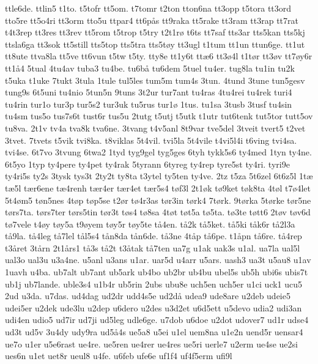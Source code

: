 {ttle6de.
ttlin5
t1to.
t5tofr
tt5om.
t7tomr
t2ton
tton6na
tt3opp
t5tora
tt3ord
tto5re
tt5o4ri
tt3orm
tto5u
ttpar4
tt6p^^e5s
tt9raka
tt5rake
tt3ram
tt3rap
tt7rat
t4t3rep
tt3res
tt3rev
tt5rom
t5trop
t5try
t2t1r^^f8
t6ts
tt7saf
tts3ar
tts5kan
tts5kj
ttsla6ga
tt3sok
tt5still
tts5top
tts5tra
tts5t^^f8y
tt3ugl
t1tum
tt1un
ttun6ge.
tt1ut
tt8ute
ttva8la
tt5ve
tt6vun
t5tw
t5ty.
tty8e
tt1y6t
tt^^e66
tt3^^f84l
t1t^^f8r
tt3^^f8v
tt7^^f8y6r
tt1^^e54
5tual
4tu4av
tuba3
tu4be.
tu6b^^e5
tu6dem
5tuel
tu4er.
tug8la
tu1in
tu2k
t5uka
t1uke
7tukt
3tula
1tule
tul5les
tum5m
tum4s
3tun.
4tund
3tune
tun5gesv
tung9s
6t5uni
tu4nio
5tun5n
9tuns
3t2ur
tur7ant
tu4ras
4tu4rei
tu4rek
turi4
tu4rin
tur1o
tur3p
tur5s2
tur3uk
tu5rus
tur1^^f8
1tus.
tu1sa
3tusb
3tusf
tu4sin
tu4sm
tus5o
tus7s6t
tust6r
tus5u
2tutg
t5utj
t5utk
t1utr
tut6tenk
tut5tor
tutt5ov
tu8va.
2t1v
tv4a
tva8k
tva6ne.
3tvang
t4v5anl
8t9var
tve5del
3tveit
tvert5
t2vet
3tvet.
7tvets
t5vik
tvi8ka.
t8viklas
5t4vil.
tvi5la
5t4vile
t4vi5l4i
t6ving
tvi4sa.
tvi4se.
6t7vo
3tvung
6twa2
1tyd
tyg9gel
tyg5ges
6tyh
tykk5s6
ty4med
1tyn
ty4ne.
6t5yo
1typ
ty4pere
ty4pet
ty4rak
5tyrann
6tyreg
ty4rep
tyre5st
ty4ri.
tyri9e
ty4ri5s
ty2s
3tysk
tys3t
2ty2t
ty8ta
t3ytel
ty5ten
ty4ve.
2tz
t5za
5t6zel
6t6z5l
1t^^e6
t^^e65l
t^^e6r6ene
t^^e64renh
t^^e6r4er
t^^e6r4et
t^^e6r5s4
t^^f8f3l
2t1^^f8k
t^^f89ket
t^^f8k8ta
4t^^f8l
t7^^f84let
5t4^^f8m5
t^^f8n5nes
4t^^f8p
t^^f8p5se
t2^^f8r
t^^f84r3as
t^^f8r3in
t^^f8rk4
7t^^f8rk.
9t^^f8rka
5t^^f8rke
t^^f8r5ne
t^^f8rs7ta.
t^^f8rs7ter
t^^f8rs5tin
t^^f8r3t
t^^f8s4
t^^f88sa
4t^^f8t
t^^f8t5a
t^^f85ta.
t^^f83te
t^^f8tt6
2t^^f8v
t^^f8v6d
t^^f87vele
t4^^f8y
t^^f8y5a
t9^^f8yem
t^^f8y5r
t^^f8y5te
t^^e54en.
t^^e52k
t^^e55ket.
t^^e55ki
t^^e5k6r
t^^e52l3a
t^^e59la.
t^^e54leg
t^^e57lel
t^^e5l5s4
t^^e5n8da
t^^e5n6de.
t^^e53ne
4t^^e5p
t^^e56pe.
t1^^e5pn
t^^e56re.
t^^e54rep
t3^^e5ret
3t^^e5rn
2t1^^e5rs1
t^^e53s
t^^e52t
t3^^e5tak
t^^e57ten
ua7g
u1ak
uak3s
u1al.
ua7la
ual5l
ual3o
ual3u
u3a4ne.
u5anl
u3ans
u1ar.
uar5d
u4arr
u5ars.
uash3
ua3t
u5au8
u1av
1uavh
u4ba.
ub7alt
ub7ant
ub5ark
ub4bo
ub2br
ub4bu
ubel5s
ub5h
ubi6s
ubis7t
ub1j
ub7lande.
uble3s4
u1b4r
ub5rin
2ubs
ubu8e
uch5en
uch5er
u1ci
uck1
ucu5
2ud
u3da.
u7das.
ud4dag
ud2dr
udd4s5e
ud2d^^e5
udea9
ude8are
u2deb
udeie5
udei5er
u2dek
ude3lu
u2dep
u6dero
u2des
u3d2et
u6d5ett
u5devo
udia2
udi3an
udi4en
udio5
ud7ir
ud7ji
ud5leg
udle6ge.
u7dob
u6doe
u2dot
udover7
ud1r
udse4
ud3t
ud5v
3u4dy
udy9ra
ud5^^e54s
ue5a8
u5ei
u1el
uem8na
u1e2n
uend5r
uensar4
ue7o
u1er
u5e6rast
ue4re.
ue5ren
ue4rer
ue4res
ue5ri
uerle7
u2erm
ue4se
ue2si
ues6n
u1et
uet8r
ueul8
u4fe.
u6feb
ufe6e
uf1f4
uf4f5erm
ufi9l
}
